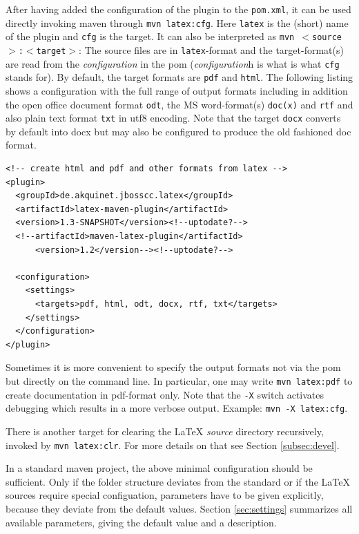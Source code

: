\documentclass[12pt]{article}
\begin{document}
After having added the configuration of the plugin to the {\tt pom.xml}, 
it can be used directly invoking maven through 
{\tt mvn latex:cfg}. 
Here {\tt latex} is the (short) name of the plugin and {\tt cfg} is the target. 
It can also be interpreted as {\tt mvn $<$source$>$:$<$target$>$}: 
The source files are in {\tt latex}-format and the target-format(s) 
are read from the {\em configuration} in the pom 
({\em configuration}h is what is what {\tt cfg} stands for). 
By default, the target formats are {\tt pdf} and {\tt html}. 
The following listing shows a configuration 
with the full range of output formats including in addition 
the open office document format {\tt odt}, 
the MS word-format(s) {\tt doc(x)} and {\tt rtf}
and also plain text format {\tt txt} in utf8 encoding. 
Note that the target {\tt docx} converts by default into \gls{docx} 
but may also be configured to produce the old fashioned \gls{doc} format. 
%
\lstset{language=xml, basicstyle=\small}
\begin{lstlisting}
<!-- create html and pdf and other formats from latex -->
<plugin>
  <groupId>de.akquinet.jbosscc.latex</groupId>
  <artifactId>latex-maven-plugin</artifactId>
  <version>1.3-SNAPSHOT</version><!--uptodate?-->
  <!--artifactId>maven-latex-plugin</artifactId>
      <version>1.2</version--><!--uptodate?-->
	
  <configuration>
    <settings>
      <targets>pdf, html, odt, docx, rtf, txt</targets>
    </settings>
  </configuration>
</plugin>
\end{lstlisting}

Sometimes it is more convenient 
to specify the output formats not via the pom 
but directly on the command line. 
In particular, one may write {\tt mvn latex:pdf} to create documentation 
in pdf-format only. 
Note that the {\tt -X} switch activates debugging 
which results in a more verbose output. 
Example: {\tt mvn -X latex:cfg}. 

There is another target for clearing the \LaTeX{} {\em source} directory 
recursively, invoked by {\tt mvn latex:clr}. 
For more details on that see Section \ref{subsec:devel}. 

In a standard maven project, 
the above minimal configuration should be sufficient. 
Only if the folder structure deviates from the standard 
or if the \LaTeX{} sources require special configuation, 
parameters have to be given explicitly, 
because they deviate from the default values. 
Section \ref{sec:settings} summarizes all available parameters, 
giving the default value and a description. 
\end{document}
